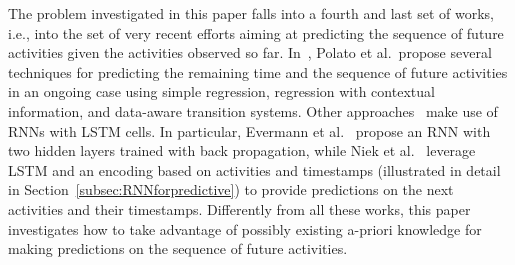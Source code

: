 The problem investigated in this paper falls into a fourth and last set of works, i.e., into the set of very recent efforts aiming at predicting the sequence of future activities given the activities observed so far.
In~\cite{Polatoetal:2016}, Polato et al.~propose several techniques for predicting the remaining time and the sequence of future activities in an ongoing case using simple regression, regression with contextual information, and data-aware transition systems.
%
%
%
Other approaches~\cite{evermann,niek96732} make use of RNNs with LSTM cells.
In particular, Evermann et al.~\cite{evermann} propose an RNN with two hidden layers trained with back propagation,  %
while Niek et al.~\cite{niek96732} leverage LSTM and an encoding based on activities and timestamps (illustrated in detail in Section~\ref{subsec:RNNforpredictive}) to provide predictions on the next activities and their timestamps.
Differently from all these works, this paper investigates how to take advantage of possibly existing a-priori knowledge for making predictions on the sequence of future activities.

